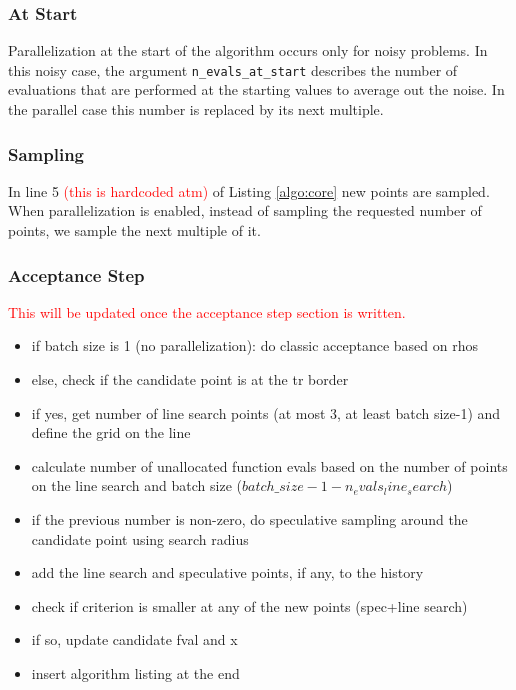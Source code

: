 \subsubsection{At Start}

Parallelization at the start of the algorithm occurs only for noisy problems. In this noisy case,
the argument \texttt{n\_evals\_at\_start} describes the number of evaluations that are performed at
the starting values to average out the noise. In the parallel case this number is replaced by its
next multiple.

\subsubsection{Sampling}

In line 5 \textcolor{red}{(this is hardcoded atm)} of Listing \ref{algo:core} new points are
sampled. When parallelization is enabled, instead of sampling the requested number of points, we
sample the next multiple of it.

\subsubsection{Acceptance Step}

\textcolor{red}{This will be updated once the acceptance step section is written.}

\begin{itemize}
    \item if batch size is 1 (no parallelization): do classic acceptance based on rhos
    \item else, check if the candidate point is at the tr border
    \item if yes, get number of line search points (at most 3, at least batch size-1) and define the
        grid on the line
    \item calculate number of unallocated function evals based on the number of points on the line
        search and batch size ($batch\_size-1-n_evals_line_search$) 
    \item if the previous number is non-zero, do speculative sampling around the candidate point
        using search radius
    \item add the line search and speculative points, if any, to the history
    \item check if criterion is smaller at any of the new points (spec+line search)
    \item if so, update candidate fval and x
    \item insert algorithm listing at the end
\end{itemize}

